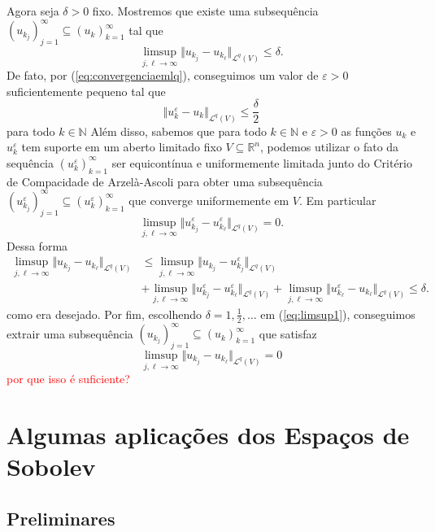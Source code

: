 \documentclass[a4paper, 11pt]{book}
\theoremstyle{definition}
\newcommand{\bN}{\mathbb{N}}
\newcommand{\bR}{\mathbb{R}}
\newcommand{\cL}{\mathcal{L}}
\begin{document}
\begin{prf}
    Agora seja $\delta > 0$ fixo. Mostremos que existe uma subsequência $(u_{k_j})_{j=1}^\infty \subseteq (u_k)_{k=1}^\infty$ tal que
    \begin{equation} \label{eq:limsup1}
        \limsup_{j,\ell \to \infty} \Vert u_{k_j} - u_{k_\ell} \Vert_{\cL^q(V)} \leqslant \delta.
    \end{equation}
    De fato, por (\ref{eq:convergenciaemlq}), conseguimos um valor de $\varepsilon > 0$ suficientemente pequeno tal que
    \[
        \Vert u_k^\varepsilon - u_k \Vert_{\cL^q(V)} \leqslant \frac{\delta}{2}
    \]
    para todo $k \in \bN$
    Além disso, sabemos que para todo $k \in \bN$ e $\varepsilon > 0$ as funções $u_k$ e $u_k^\varepsilon$ tem suporte em um aberto limitado fixo $V \subseteq \bR^n$, podemos utilizar o fato da sequência $(u_k^\varepsilon)_{k=1}^\infty$ ser equicontínua e uniformemente limitada junto do Critério de Compacidade de Arzelà-Ascoli para obter uma subsequência $(u_{k_j}^\varepsilon)_{j=1}^\infty \subseteq (u_k^\varepsilon)_{k=1}^\infty$ que converge uniformemente em $V$.
    Em particular
    \[
        \limsup_{j,\ell \to \infty} \Vert u_{k_j}^\varepsilon - u_{k_\ell}^\varepsilon \Vert_{\cL^q(V)} = 0.
    \]
    Dessa forma
    \[
        \begin{aligned}
            \limsup_{j,\ell \to \infty} \Vert u_{k_j} - u_{k_\ell} \Vert_{\cL^q(V)} &\leqslant \limsup_{j,\ell \to \infty} \Vert u_{k_j} - u_{k_j}^\varepsilon \Vert_{\cL^q(V)} \\
            &+ \limsup_{j,\ell \to \infty} \Vert u_{k_j}^\varepsilon - u_{k_\ell}^\varepsilon \Vert_{\cL^q(V)} + \limsup_{j,\ell \to \infty} \Vert u_{k_\ell}^\varepsilon - u_{k_\ell} \Vert_{\cL^q(V)} \leqslant \delta.
        \end{aligned}
    \]
    como era desejado.
    Por fim, escolhendo $\delta = 1,\frac{1}{2},\dots$ em (\ref{eq:limsup1}), conseguimos extrair uma subsequência $(u_{k_j})_{j=1}^\infty \subseteq (u_k)_{k=1}^\infty$ que satisfaz
    \[
        \limsup_{j,\ell \to \infty} \Vert u_{k_j} - u_{k_\ell} \Vert_{\cL^q(V)} = 0
    \]
    \textcolor{red}{por que isso é suficiente?}
\end{prf}

\chapter{Algumas aplicações dos Espaços de Sobolev}

\section{Preliminares}
\end{document}

